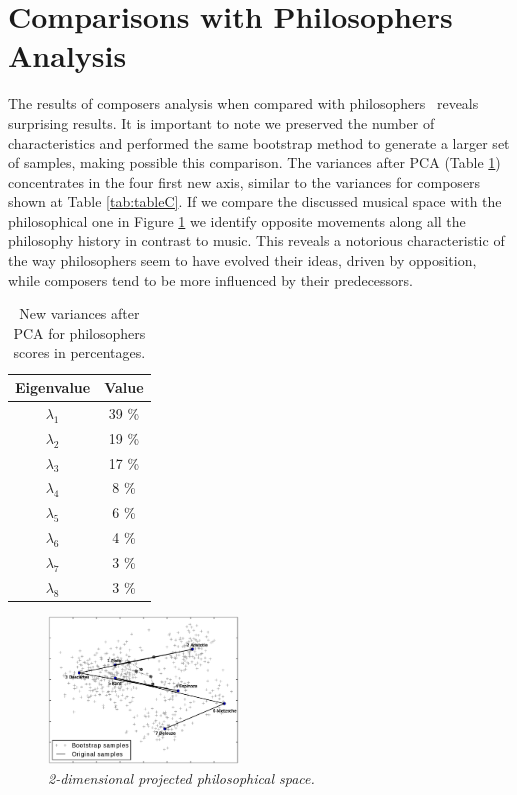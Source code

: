 \documentclass[
 aip,
 jmp,
 amsmath,amssymb,
 reprint,
]{revtex4-1}
\begin{document}
\section{Comparisons with Philosophers Analysis}

The results of composers analysis when compared with philosophers~\cite{Fabbri}
reveals surprising results. It is important to note we preserved the
number of characteristics and performed the same bootstrap method to
generate a larger set of samples, making possible this
comparison. The variances after PCA (Table \ref{tab:varphi}) concentrates in the four
first new axis, similar to the variances for composers shown at Table \ref{tab:tableC}. If we compare the discussed musical space
with the philosophical one in Figure \ref{fig:phipca} we
identify opposite movements along all the philosophy history in contrast
to music. This reveals a notorious characteristic of the way
philosophers seem to have evolved their ideas, driven by opposition, while
composers tend to be more influenced by their predecessors.

\begin{table}[ht]
\caption{\label{tab:varphi}New variances after PCA for philosophers
  scores in percentages.}

\begin{tabular}{|c||c|}
\hline
Eigenvalue  & Value     \\ \hline

$\lambda_1$ &  39 \% \\
$\lambda_2$ &  19 \% \\
$\lambda_3$ &  17 \% \\
$\lambda_4$ &   8 \% \\
$\lambda_5$ &   6 \% \\
$\lambda_6$ &   4 \% \\
$\lambda_7$ &   3 \% \\
$\lambda_8$ &   3 \% \\
\hline

\end{tabular}
\end{table}


\begin{figure}
  \begin{center}
    \includegraphics[width=0.45\textwidth]{g1filosofos}
  \end{center}
  \caption{\it 2-dimensional projected philosophical space.}
  \label{fig:phipca}
\end{figure}
\end{document}
